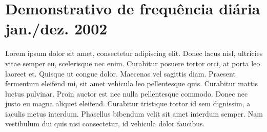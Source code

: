 {\let\clearpage\relax \chapter{\textnormal{Demonstrativo de frequência diária jan./dez. 2002}}}

Lorem ipsum dolor sit amet, consectetur adipiscing elit. Donec lacus nisl, ultricies vitae semper eu, scelerisque nec enim. Curabitur posuere tortor orci, at porta leo laoreet et. Quisque ut congue dolor. Maecenas vel sagittis diam. Praesent fermentum eleifend mi, sit amet vehicula leo pellentesque quis. Curabitur mattis luctus pulvinar. Proin auctor est nec nulla pellentesque commodo. Donec nec justo eu magna aliquet eleifend. Curabitur tristique tortor id sem dignissim, a iaculis metus interdum. Phasellus bibendum velit sit amet interdum semper. Nam vestibulum dui quis nisi consectetur, id vehicula dolor faucibus. \\